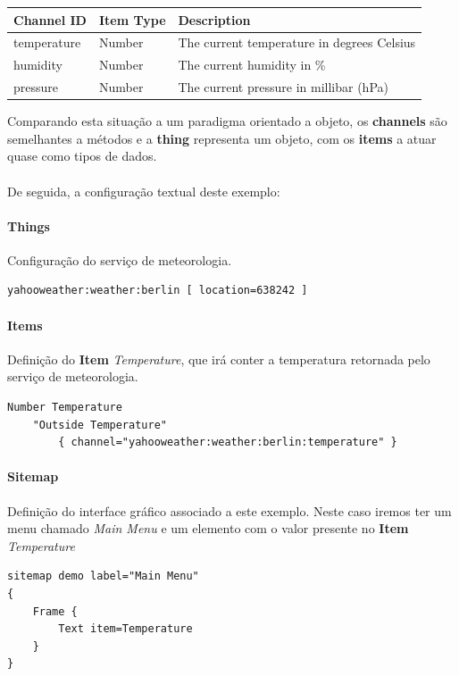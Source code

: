 \begin{tabular}{lll}
\textbf{Channel ID}                        & \textbf{Item Type}                   & \textbf{Description}                                                     \\ \hline
\multicolumn{1}{|l|}{temperature} & \multicolumn{1}{l|}{Number} & \multicolumn{1}{l|}{The current temperature in degrees Celsius} \\ \hline
\multicolumn{1}{|l|}{humidity}    & \multicolumn{1}{l|}{Number} & \multicolumn{1}{l|}{The current humidity in \%}                 \\ \hline
\multicolumn{1}{|l|}{pressure}    & \multicolumn{1}{l|}{Number} & \multicolumn{1}{l|}{The current pressure in millibar (hPa)}     \\ \hline
\end{tabular}

Comparando esta situação a um paradigma orientado a objeto, os \textbf{channels} são semelhantes a métodos e a \textbf{thing} representa um objeto, com os \textbf{items} a atuar quase como tipos de dados.\\\\

De seguida, a configuração textual deste exemplo:

\paragraph*{Things}
\noindent
Configuração do serviço de meteorologia. 

\begin{Verbatim}
yahooweather:weather:berlin [ location=638242 ]
\end{Verbatim}

\paragraph*{Items}
\noindent
Definição do \textbf{Item} \textit{Temperature}, que irá conter a temperatura retornada pelo serviço de meteorologia.

\begin{Verbatim}
Number Temperature 
    "Outside Temperature" 
        { channel="yahooweather:weather:berlin:temperature" }
\end{Verbatim}

\paragraph*{Sitemap}
\noindent
Definição do interface gráfico associado a este exemplo. Neste caso iremos ter um menu chamado \textit{Main Menu} e um elemento com o valor presente no \textbf{Item} \textit{Temperature}

\begin{Verbatim}
sitemap demo label="Main Menu"
{
	Frame {
		Text item=Temperature
	}
}
\end{Verbatim}


